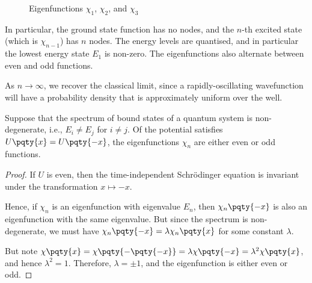 \begin{figure}[ht]
    \centering
    \caption{Eigenfunctions \(\chi_1\), \(\chi_2\), and \(\chi_3\)}
    \label{fig:infinite-well-eigenfunctions}%
\end{figure}

In particular, the ground state function has no nodes, and the \(n\)-th excited state (which is \(\chi_{n - 1}\)) has \(n\) nodes. The energy levels are quantised, and in particular the lowest energy state \(E_1\) is non-zero. The eigenfunctions also alternate between even and odd functions.

As \(n \to \infty\), we recover the classical limit, since a rapidly-oscillating wavefunction will have a probability density that is approximately uniform over the well.

\begin{lemma}
    Suppose that the spectrum of bound states of a quantum system is non-degenerate, i.e., \(E_i \neq E_j\) for \(i \neq j\). Of the potential satisfies \(U\pqty{x} = U\pqty{-x}\), the eigenfunctions \(\chi_n\) are either even or odd functions.
\end{lemma}

\begin{proof}
    If \(U\) is even, then the time-independent Schr\"{o}dinger equation is invariant under the transformation \(x \mapsto -x\).
    
    Hence, if \(\chi_n\) is an eigenfunction with eigenvalue \(E_n\), then \(\chi_n\pqty{-x}\) is also an eigenfunction with the same eigenvalue. But since the spectrum is non-degenerate, we must have \(\chi_n\pqty{-x} = \lambda \chi_n\pqty{x}\) for some constant \(\lambda\).

    But note \(\chi\pqty{x} = \chi\pqty{-\pqty{-x}} = \lambda \chi\pqty{-x} = \lambda^2 \chi\pqty{x}\), and hence \(\lambda^2 = 1\). Therefore, \(\lambda = \pm 1\), and the eigenfunction is either even or odd.
\end{proof}

